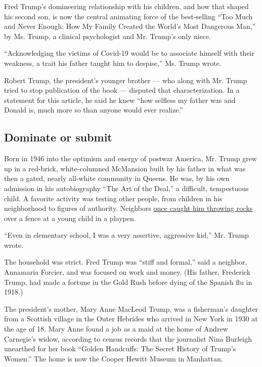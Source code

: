 Fred Trump's domineering relationship with his children, and how that
shaped his second son, is now the central animating force of the
best-selling ``Too Much and Never Enough: How My Family Created the
World's Most Dangerous Man,'' by Ms. Trump, a clinical psychologist and
Mr. Trump's only niece.

``Acknowledging the victims of Covid-19 would be to associate himself
with their weakness, a trait his father taught him to despise,'' Ms.
Trump wrote.

Robert Trump, the president's younger brother --- who along with Mr.
Trump tried to stop publication of the book --- disputed that
characterization. In a statement for this article, he said he knew ``how
selfless my father was and Donald is, much more so than anyone would
ever realize.''

\hypertarget{dominate-or-submit}{%
\subsection{Dominate or submit}\label{dominate-or-submit}}

Born in 1946 into the optimism and energy of postwar America, Mr. Trump
grew up in a red-brick, white-columned McMansion built by his father in
what was then a gated, nearly all-white community in Queens. He was, by
his own admission in his autobiography ``The Art of the Deal,'' a
difficult, tempestuous child. A favorite activity was testing other
people, from children in his neighborhood to figures of authority.
Neighbors
\href{https://www.washingtonpost.com/lifestyle/style/young-donald-trump-military-school/2016/06/22/f0b3b164-317c-11e6-8758-d58e76e11b12_story.html}{once
caught him throwing rocks} over a fence at a young child in a playpen.

``Even in elementary school, I was a very assertive, aggressive kid,''
Mr. Trump wrote.

The household was strict. Fred Trump was ``stiff and formal,'' said a
neighbor, Annamaria Forcier, and was focused on work and money. (His
father, Frederick Trump, had made a fortune in the Gold Rush before
dying of the Spanish flu in 1918.)

The president's mother, Mary Anne MacLeod Trump, was a fisherman's
daughter from a Scottish village in the Outer Hebrides who arrived in
New York in 1930 at the age of 18. Mary Anne found a job as a maid at
the home of Andrew Carnegie's widow, according to census records that
the journalist Nina Burleigh unearthed for her book ``Golden Handcuffs:
The Secret History of Trump's Women.'' The home is now the Cooper Hewitt
Museum in Manhattan.

